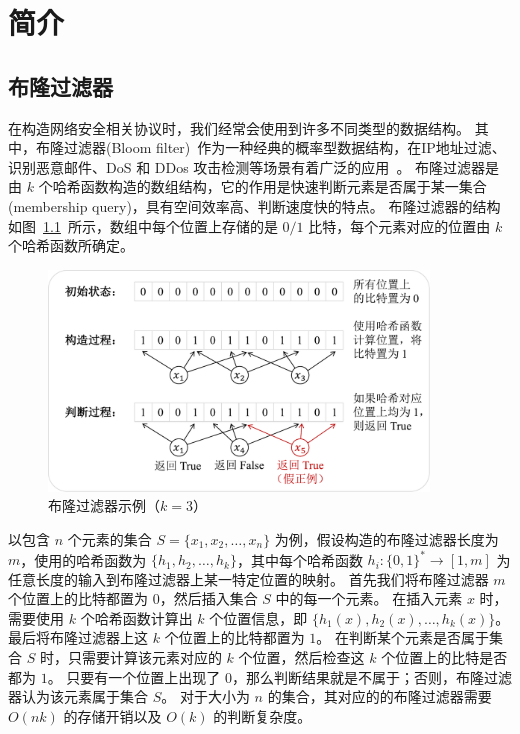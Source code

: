 
\chapter{简介}

\section{布隆过滤器}

在构造网络安全相关协议时，我们经常会使用到许多不同类型的数据结构。
其中，布隆过滤器(Bloom filter)~\cite{bloom1970space}作为一种经典的概率型数据结构，在IP地址过滤、识别恶意邮件、DoS 和 DDos 攻击检测等场景有着广泛的应用~\cite{geravand2013bloom,patgiri2023bloom}。
布隆过滤器是由 $k$ 个哈希函数构造的数组结构，它的作用是快速判断元素是否属于某一集合(membership query)，具有空间效率高、判断速度快的特点。
布隆过滤器的结构如图~\ref{fig:Bloom_example}~所示，数组中每个位置上存储的是 $0/1$ 比特，每个元素对应的位置由 $k$ 个哈希函数所确定。
\begin{figure}[ht]
  \centering
  \includegraphics[width=0.9\textwidth]{figures/bf_exp.pdf}
  \caption{布隆过滤器示例（$k=3$）}
  \label{fig:Bloom_example}
\end{figure}
以包含 $n$ 个元素的集合 $S=\{x_1, x_2, \dots, x_n\}$ 为例，假设构造的布隆过滤器长度为 $m$，使用的哈希函数为 $\{h_1, h_2, \dots, h_k\}$，其中每个哈希函数 $h_i:\{0,1\}^* \to [1, m]$ 为任意长度的输入到布隆过滤器上某一特定位置的映射。
首先我们将布隆过滤器 $m$ 个位置上的比特都置为 $0$，然后插入集合 $S$ 中的每一个元素。
在插入元素 $x$ 时，需要使用 $k$ 个哈希函数计算出 $k$ 个位置信息，即 $\{h_1(x),h_2(x),\dots, h_k(x)\}$。
最后将布隆过滤器上这 $k$ 个位置上的比特都置为 $1$。
在判断某个元素是否属于集合 $S$ 时，只需要计算该元素对应的 $k$ 个位置，然后检查这 $k$ 个位置上的比特是否都为 $1$。
只要有一个位置上出现了 $0$，那么判断结果就是不属于；否则，布隆过滤器认为该元素属于集合 $S$。
对于大小为 $n$ 的集合，其对应的的布隆过滤器需要 $O(nk)$ 的存储开销以及 $O(k)$ 的判断复杂度。

